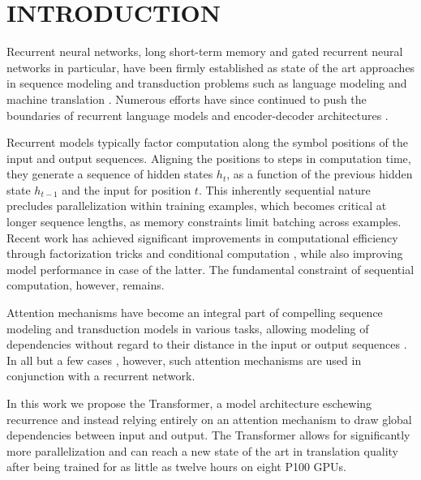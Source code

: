 \documentclass[conference]{IEEEtran}
\begin{document}
\section{INTRODUCTION}
Recurrent neural networks, long short-term memory \cite{ref13} and gated recurrent \cite{ref7} neural networks in particular, have been firmly established as state of the art approaches in sequence modeling and transduction problems such as language modeling and machine translation \cite{ref35, ref2, ref5}. Numerous efforts have since continued to push the boundaries of recurrent language models and encoder-decoder architectures \cite{ref38, ref24, ref15}.

Recurrent models typically factor computation along the symbol positions of the input and output sequences. Aligning the positions to steps in computation time, they generate a sequence of hidden states $h_t$, as a function of the previous hidden state $h_{t-1}$ and the input for position $t$. This inherently sequential nature precludes parallelization within training examples, which becomes critical at longer sequence lengths, as memory constraints limit batching across examples. Recent work has achieved significant improvements in computational efficiency through factorization tricks \cite{ref21} and conditional computation \cite{ref32}, while also improving model performance in case of the latter. The fundamental constraint of sequential computation, however, remains.

Attention mechanisms have become an integral part of compelling sequence modeling and transduction models in various tasks, allowing modeling of dependencies without regard to their distance in the input or output sequences \cite{ref2, ref19}. In all but a few cases \cite{ref27}, however, such attention mechanisms are used in conjunction with a recurrent network.

In this work we propose the Transformer, a model architecture eschewing recurrence and instead relying entirely on an attention mechanism to draw global dependencies between input and output. The Transformer allows for significantly more parallelization and can reach a new state of the art in translation quality after being trained for as little as twelve hours on eight P100 GPUs.
\end{document}
